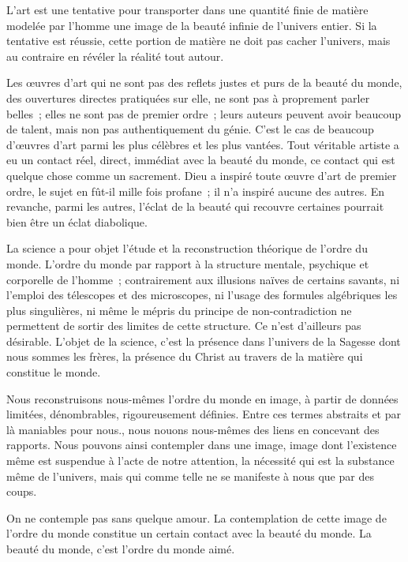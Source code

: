 \documentclass[french,twoside]{book} %
\begin{document}
L'art est une tentative pour transporter dans une quantité finie de matière modelée par l'homme une image de la beauté infinie de l'univers entier. Si la tentative est réussie, cette portion de matière ne doit pas cacher l'univers, mais au contraire en révéler la réalité tout autour.\par
Les œuvres d'art qui ne sont pas des reflets justes et purs de la beauté du monde, des ouvertures directes pratiquées sur elle, ne sont pas à proprement parler belles ; elles ne sont pas de premier ordre ; leurs auteurs peuvent avoir beaucoup de talent, mais non pas authentiquement du génie. C'est le cas de beaucoup d'œuvres d'art parmi les plus célèbres et les plus vantées. Tout véritable artiste a eu un contact réel, direct, immédiat avec la beauté du monde, ce contact qui est quelque chose comme un sacrement. Dieu a inspiré toute œuvre d'art de premier ordre, le sujet en fût-il mille fois profane ; il n'a inspiré aucune des autres. En revanche, parmi les autres, l'éclat de la beauté qui recouvre certaines pourrait bien être un éclat diabolique.\par
La science a pour objet l'étude et la reconstruction théorique de l'ordre du monde. L'ordre du monde par rapport à la structure mentale, psychique et corporelle de l'homme ; contrairement aux illusions naïves de certains savants, ni l'emploi des télescopes et des microscopes, ni l'usage des formules algébriques les plus singulières, ni même le mépris du principe de non-contradiction ne permettent de sortir des limites de cette structure. Ce n'est d'ailleurs pas désirable. L'objet de la science, c'est la présence dans l'univers de la Sagesse dont nous sommes les frères, la présence du Christ au travers de la matière qui constitue le monde.\par
Nous reconstruisons nous-mêmes l'ordre du monde en image, à partir de données limitées, dénombrables, rigoureusement définies. Entre ces termes abstraits et par là maniables pour nous., nous nouons nous-mêmes des liens en concevant des rapports. Nous pouvons ainsi contempler dans une image, image dont l'existence même est suspendue à l'acte de notre attention, la nécessité qui est la substance même de l'univers, mais qui comme telle ne se manifeste à nous que par des coups.\par
On ne contemple pas sans quelque amour. La contemplation de cette image de l'ordre du monde constitue un certain contact avec la beauté du monde. La beauté du monde, c'est l'ordre du monde aimé.\par
\end{document}
